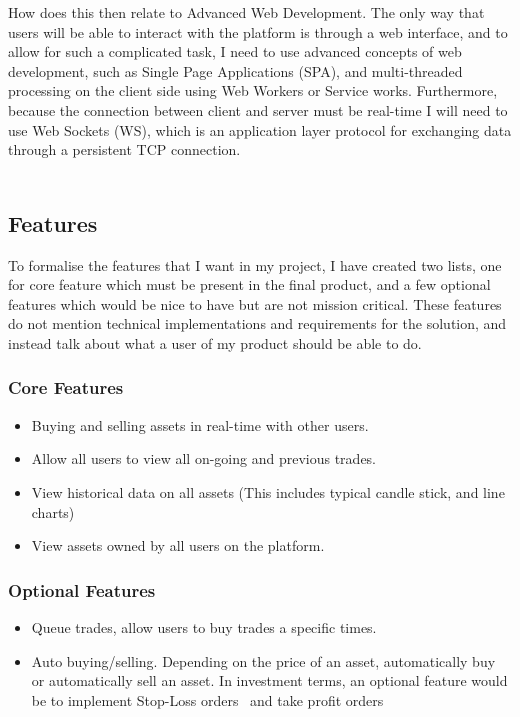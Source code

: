 \documentclass[titlepage]{article}
\begin{document}
\noindent
How does this then relate to Advanced Web Development. The only way that users will be able to interact with the platform is through a web interface, and to allow for such a complicated task, I need to use advanced concepts of web development, such as Single Page Applications (SPA), and multi-threaded processing on the client side using Web Workers or Service works. Furthermore, because the connection between client and server must be real-time I will need to use Web Sockets (WS), which is an application layer protocol for exchanging data through a persistent TCP connection. \\
\\

\subsection{Features}
To formalise the features that I want in my project, I have created two lists, one for core feature which must be present in the final product, and a few optional features which would be nice to have but are not mission critical. These features do not mention technical implementations and requirements for the solution, and instead talk about what a user of my product should be able to do.

\subsubsection{Core Features}
\begin{itemize}
	\item Buying and selling assets in real-time with other users.
	\item Allow all users to view all on-going and previous trades.
	\item View historical data on all assets (This includes typical candle stick, and line charts)
	\item View assets owned by all users on the platform.
\end{itemize}

\subsubsection{Optional Features}
\begin{itemize}
  \item Queue trades, allow users to buy trades a specific times.
  \item Auto buying/selling. Depending on the price of an asset, automatically buy or automatically sell an asset. In investment terms, an optional feature would be to implement Stop-Loss orders~\cite{stop_loss} and  take profit orders~\cite{take_profit}
\end{itemize}
\end{document}
